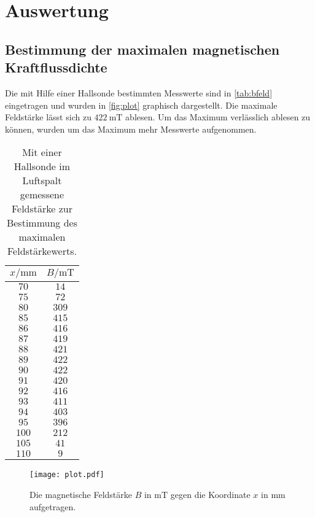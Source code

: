 \section{Auswertung}
\label{sec:Auswertung}

\subsection{Bestimmung der maximalen magnetischen Kraftflussdichte}
Die mit Hilfe einer Hallsonde bestimmten Messwerte sind in \autoref{tab:bfeld} eingetragen und wurden in
\autoref{fig:plot} graphisch dargestellt. Die maximale Feldstärke lässt sich zu $\SI{422}{\milli\tesla}$
ablesen. Um das Maximum verlässlich ablesen zu können, wurden um das Maximum mehr Messwerte aufgenommen.

\begin{table}[hbt!]
  \centering
  \caption{Mit einer Hallsonde im Luftspalt gemessene Feldstärke zur Bestimmung des maximalen Feldstärkewerts.}
  \label{tab:bfeld}
  \begin{tabular}{c c}
    \toprule
    $x/\si{\milli\meter}$ & $B/\si{\milli\tesla}$\\
    \midrule
    $ 70$ & $ 14$ \\
    $ 75$ & $ 72$ \\
    $ 80$ & $309$ \\
    $ 85$ & $415$ \\
    $ 86$ & $416$ \\
    $ 87$ & $419$ \\
    $ 88$ & $421$ \\
    $ 89$ & $422$ \\
    $ 90$ & $422$ \\
    $ 91$ & $420$ \\
    $ 92$ & $416$ \\
    $ 93$ & $411$ \\
    $ 94$ & $403$ \\
    $ 95$ & $396$ \\
    $100$ & $212$ \\
    $105$ & $ 41$ \\
    $110$ & $  9$ \\
    \bottomrule
  \end{tabular}
\end{table}

\begin{figure}[hbt!]
  \centering
  \texttt{[image: plot.pdf]}
  \caption{Die magnetische Feldstärke $B$ in $\si{\milli\tesla}$ gegen die Koordinate $x$ in $\si{\milli\meter}$
  aufgetragen.}
  \label{fig:plot}
\end{figure}
\newpage

